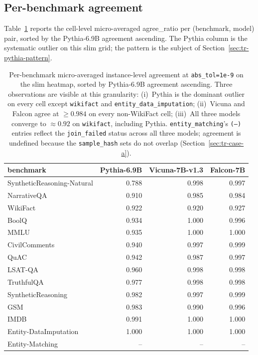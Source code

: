 \documentclass[11pt]{article}
\begin{document}
\subsection{Per-benchmark agreement}
\label{sec:tr-perbench}

Table~\ref{tab:tr-perbench} reports the cell-level micro-averaged
  agree\_ratio per (benchmark, model) pair, sorted by the Pythia-6.9B
  agreement ascending.
The Pythia column is the systematic outlier on this slim grid; the
  pattern is the subject of Section~\ref{sec:tr-pythia-pattern}.

\begin{table}[htbp]
\centering
\small
\caption{Per-benchmark micro-averaged instance-level agreement at
  \texttt{abs\_tol=1e-9} on the slim heatmap, sorted by Pythia-6.9B
  agreement ascending.
Three observations are visible at this granularity:
  (i)~Pythia is the dominant outlier on every cell except
  \texttt{wikifact} and \texttt{entity\_data\_imputation};
  (ii)~Vicuna and Falcon agree at $\geq 0.984$ on every non-WikiFact
  cell;
  (iii)~All three models converge to $\approx 0.92$ on
  \texttt{wikifact}, including Pythia.
\texttt{entity\_matching}'s \texttt{(--)} entries reflect the
  \texttt{join\_failed} status across all three models; agreement
  is undefined because the \texttt{sample\_hash} sets do not
  overlap (Section~\ref{sec:tr-case-a}).}
\label{tab:tr-perbench}
\begin{tabular}{lrrr}
\toprule
benchmark & Pythia-6.9B & Vicuna-7B-v1.3 & Falcon-7B \\
\midrule
SyntheticReasoning-Natural   & 0.788 & 0.998 & 0.997 \\
NarrativeQA                  & 0.910 & 0.985 & 0.984 \\
WikiFact                     & 0.922 & 0.920 & 0.927 \\
BoolQ                        & 0.934 & 1.000 & 0.996 \\
MMLU                         & 0.935 & 1.000 & 1.000 \\
CivilComments                & 0.940 & 0.997 & 0.999 \\
QuAC                         & 0.942 & 0.987 & 0.997 \\
LSAT-QA                      & 0.960 & 0.998 & 0.998 \\
TruthfulQA                   & 0.977 & 0.998 & 0.998 \\
SyntheticReasoning           & 0.982 & 0.997 & 0.999 \\
GSM                          & 0.983 & 0.990 & 0.996 \\
IMDB                         & 0.991 & 1.000 & 1.000 \\
Entity-DataImputation        & 1.000 & 1.000 & 1.000 \\
\midrule
Entity-Matching              & --    & --    & --    \\
\bottomrule
\end{tabular}
\end{table}
\end{document}
